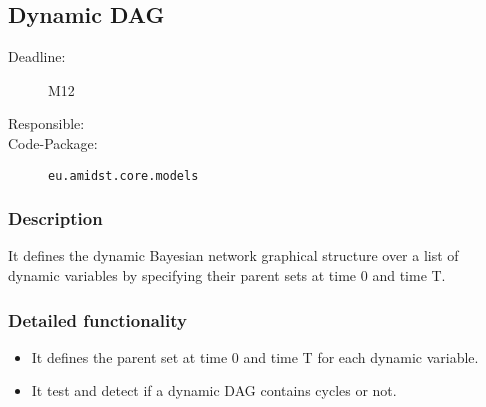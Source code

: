 \subsection{Dynamic DAG}
\label{DynamicDAG:ID}

\begin{description}
\item[Deadline:] M12
\item[Responsible:]
\item[Code-Package:] \texttt{eu.amidst.core.models}
\end{description}

\subsubsection*{Description}

It defines the dynamic Bayesian network graphical structure over a list of dynamic variables by specifying their parent sets at time 0 and time T.

\subsubsection*{Detailed functionality}

\begin{itemize}
\item It defines the parent set at time 0 and time T for each dynamic variable.
\item It test and detect if a dynamic DAG contains cycles or not.
\end{itemize}